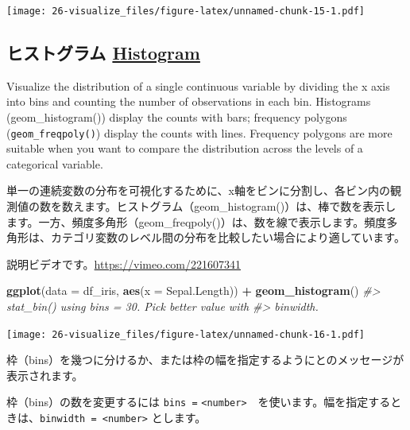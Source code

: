 \documentclass[
  xelatex, ja=standard]{bxjsbook}
\newenvironment{Shaded}{\begin{snugshade}}{\end{snugshade}}
\newcommand{\AttributeTok}[1]{\textcolor[rgb]{0.13,0.29,0.53}{#1}}
\newcommand{\CommentTok}[1]{\textcolor[rgb]{0.56,0.35,0.01}{\textit{#1}}}
\newcommand{\FunctionTok}[1]{\textcolor[rgb]{0.13,0.29,0.53}{\textbf{#1}}}
\newcommand{\NormalTok}[1]{#1}
\newcommand{\SpecialCharTok}[1]{\textcolor[rgb]{0.81,0.36,0.00}{\textbf{#1}}}
\theoremstyle{definition}
\theoremstyle{definition}
\theoremstyle{definition}
\theoremstyle{definition}
\theoremstyle{remark}
\begin{document}
\texttt{[image: 26-visualize\_files/figure-latex/unnamed-chunk-15-1.pdf]}

\hypertarget{ux30d2ux30b9ux30c8ux30b0ux30e9ux30e0-histogram}{%
\subsection{\texorpdfstring{ヒストグラム \href{https://ggplot2.tidyverse.org/reference/geom_histogram.html}{Histogram}}{ヒストグラム Histogram}}\label{ux30d2ux30b9ux30c8ux30b0ux30e9ux30e0-histogram}}

Visualize the distribution of a single continuous variable by dividing the x axis into bins and counting the number of observations in each bin. Histograms (geom\_histogram()) display the counts with bars; frequency polygons (\texttt{geom\_freqpoly()}) display the counts with lines. Frequency polygons are more suitable when you want to compare the distribution across the levels of a categorical variable.

単一の連続変数の分布を可視化するために、x軸をビンに分割し、各ビン内の観測値の数を数えます。ヒストグラム（geom\_histogram()）は、棒で数を表示します。一方、頻度多角形（geom\_freqpoly()）は、数を線で表示します。頻度多角形は、カテゴリ変数のレベル間の分布を比較したい場合により適しています。

説明ビデオです。\url{https://vimeo.com/221607341}

\begin{Shaded}
\begin{Highlighting}[]
\FunctionTok{ggplot}\NormalTok{(}\AttributeTok{data =}\NormalTok{ df\_iris, }\FunctionTok{aes}\NormalTok{(}\AttributeTok{x =}\NormalTok{ Sepal.Length)) }\SpecialCharTok{+}
  \FunctionTok{geom\_histogram}\NormalTok{()}
\CommentTok{\#\textgreater{} \textasciigrave{}stat\_bin()\textasciigrave{} using \textasciigrave{}bins = 30\textasciigrave{}. Pick better value with}
\CommentTok{\#\textgreater{} \textasciigrave{}binwidth\textasciigrave{}.}
\end{Highlighting}
\end{Shaded}

\texttt{[image: 26-visualize\_files/figure-latex/unnamed-chunk-16-1.pdf]}

枠（bins）を幾つに分けるか、または枠の幅を指定するようにとのメッセージが表示されます。

枠（bins）の数を変更するには \texttt{bins\ =} \texttt{\textless{}number\textgreater{}}　を使います。幅を指定するときは、\texttt{binwidth\ =\ \textless{}number\textgreater{}} とします。
\end{document}
